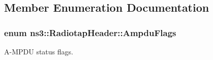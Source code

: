 \subsection{Member Enumeration Documentation}
\subsubsection[{\texorpdfstring{Ampdu\+Flags}{AmpduFlags}}]{\setlength{\rightskip}{0pt plus 5cm}enum {\bf ns3\+::\+Radiotap\+Header\+::\+Ampdu\+Flags}}\hypertarget{classns3_1_1RadiotapHeader_a9f8333ba19c8dc9ae63e7e03af87a557}{}\label{classns3_1_1RadiotapHeader_a9f8333ba19c8dc9ae63e7e03af87a557}


A-\/\+M\+P\+DU status flags. 

